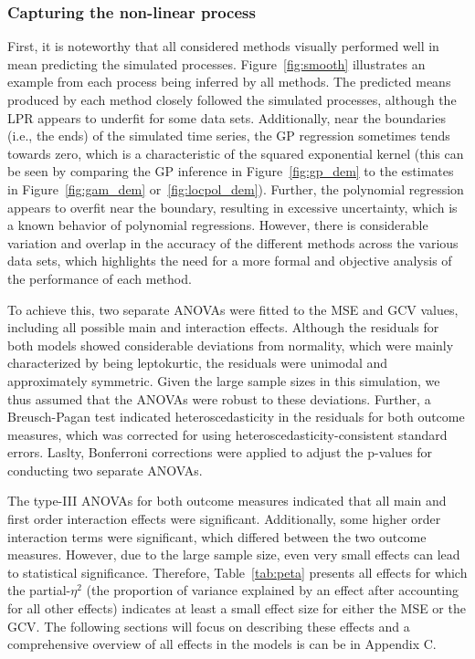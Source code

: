 \documentclass[man, floatsintext]{apa7}
\begin{document}
\subsubsection{Capturing the non-linear process}

First, it is noteworthy that all considered methods visually performed well in
mean predicting the simulated processes. Figure~\ref{fig:smooth} illustrates an
example from each process being inferred by all methods. The predicted means
produced by each method closely followed the simulated processes, although the
LPR appears to underfit for some data sets. Additionally, near the boundaries
(i.e., the ends) of the simulated time series, the GP regression sometimes
tends towards zero, which is a characteristic of the squared exponential kernel
(this can be seen by comparing the GP inference in Figure~\ref{fig:gp_dem} to
the estimates in Figure~\ref{fig:gam_dem} or~\ref{fig:locpol_dem}). Further,
the polynomial regression appears to overfit near the boundary, resulting in
excessive uncertainty, which is a known behavior of polynomial regressions.
However, there is considerable variation and overlap in the accuracy of the
different methods across the various data sets, which highlights the need for a
more formal and objective analysis of the performance of each method.

\begin{sidewaysfigure*}[htbp]
  \caption{Example process inference by each of the introduced methods}
  \label{fig:smooth}
\end{sidewaysfigure*}

To achieve this, two separate ANOVAs were fitted to the MSE and GCV values,
including all possible main and interaction effects. Although the residuals for
both models showed considerable deviations from normality, which were mainly
characterized by being leptokurtic, the residuals were unimodal and
approximately symmetric. Given the large sample sizes in this simulation, we
thus assumed that the ANOVAs were robust to these deviations. Further, a
Breusch-Pagan test indicated heteroscedasticity in the residuals for both
outcome measures, which was corrected for using heteroscedasticity-consistent
standard errors. Laslty, Bonferroni corrections were applied to adjust the
p-values for conducting two separate ANOVAs.

The type-III ANOVAs for both outcome measures indicated that all main and first
order interaction effects were significant. Additionally, some higher order
interaction terms were significant, which differed between the two outcome
measures. However, due to the large sample size, even very small effects can
lead to statistical significance. Therefore, Table~\ref{tab:peta} presents all
effects for which the partial-$\eta^2$ (the proportion of variance explained by
an effect after accounting for all other effects) indicates at least a small
effect size for either the MSE or the GCV\@. The following sections will focus
on describing these effects and a comprehensive overview of all effects in the
models is can be in Appendix C.
\end{document}
